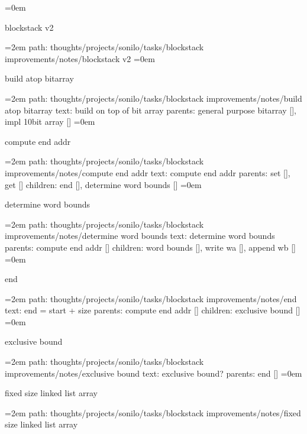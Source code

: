 \smallskip
\leftskip=0em
\par\endgroup
\bigskip
{}
blockstack v2
\smallskip
\par\begingroup
\leftskip=2em
path: thoughts/projects/sonilo/tasks/blockstack improvements/notes/blockstack v2
\smallskip
\leftskip=0em
\par\endgroup
\bigskip
{}
build atop bitarray
\smallskip
\par\begingroup
\leftskip=2em
path: thoughts/projects/sonilo/tasks/blockstack improvements/notes/build atop bitarray
\smallskip
text:  build on top of bit array
\smallskip
parents:  general purpose bitarray [], impl 10bit array []
\smallskip
\leftskip=0em
\par\endgroup
\bigskip
{}
compute end addr
\smallskip
\par\begingroup
\leftskip=2em
path: thoughts/projects/sonilo/tasks/blockstack improvements/notes/compute end addr
\smallskip
text:  compute end addr
\smallskip
parents:  set [], get []
\smallskip
children: end [], determine word bounds []
\smallskip
\leftskip=0em
\par\endgroup
\bigskip
{}
determine word bounds
\smallskip
\par\begingroup
\leftskip=2em
path: thoughts/projects/sonilo/tasks/blockstack improvements/notes/determine word bounds
\smallskip
text:  determine word bounds
\smallskip
parents:  compute end addr []
\smallskip
children: word bounds [], write wa [], append wb []
\smallskip
\leftskip=0em
\par\endgroup
\bigskip
{}
end
\smallskip
\par\begingroup
\leftskip=2em
path: thoughts/projects/sonilo/tasks/blockstack improvements/notes/end
\smallskip
text:  end = start + size
\smallskip
parents:  compute end addr []
\smallskip
children: exclusive bound []
\smallskip
\leftskip=0em
\par\endgroup
\bigskip
{}
exclusive bound
\smallskip
\par\begingroup
\leftskip=2em
path: thoughts/projects/sonilo/tasks/blockstack improvements/notes/exclusive bound
\smallskip
text:  exclusive bound?
\smallskip
parents:  end []
\smallskip
\leftskip=0em
\par\endgroup
\bigskip
{}
fixed size linked list array
\smallskip
\par\begingroup
\leftskip=2em
path: thoughts/projects/sonilo/tasks/blockstack improvements/notes/fixed size linked list array
